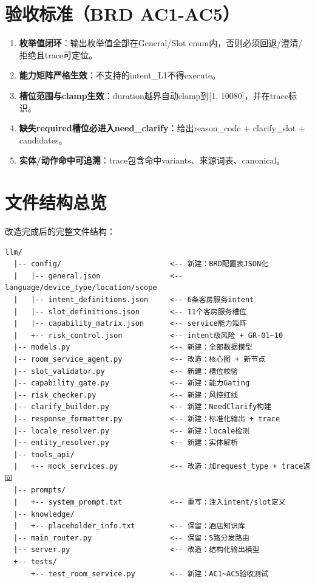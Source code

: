 \documentclass[12pt,a4paper]{ctexart}
\begin{document}
\section{验收标准（BRD AC1-AC5）}

\begin{enumerate}[label=\textbf{AC\arabic*}:, leftmargin=*]
    \item \textbf{枚举值闭环}：输出枚举值全部在General/Slot enum内，否则必须回退/澄清/拒绝且trace可定位。
    \item \textbf{能力矩阵严格生效}：不支持的intent\_L1不得execute。
    \item \textbf{槽位范围与clamp生效}：duration越界自动clamp到[1, 10080]，并在trace标识。
    \item \textbf{缺失required槽位必进入need\_clarify}：给出reason\_code + clarify\_slot + candidates。
    \item \textbf{实体/动作命中可追溯}：trace包含命中variants、来源词表、canonical。
\end{enumerate}

\newpage

\section{文件结构总览}

改造完成后的完整文件结构：

\begin{verbatim}
llm/
  |-- config/                         <-- 新建：BRD配置表JSON化
  |   |-- general.json                <-- language/device_type/location/scope
  |   |-- intent_definitions.json     <-- 6条客房服务intent
  |   |-- slot_definitions.json       <-- 11个客房服务槽位
  |   |-- capability_matrix.json      <-- service能力矩阵
  |   +-- risk_control.json           <-- intent级风险 + GR-01~10
  |-- models.py                       <-- 新建：全部数据模型
  |-- room_service_agent.py           <-- 改造：核心图 + 新节点
  |-- slot_validator.py               <-- 新建：槽位校验
  |-- capability_gate.py              <-- 新建：能力Gating
  |-- risk_checker.py                 <-- 新建：风控红线
  |-- clarify_builder.py              <-- 新建：NeedClarify构建
  |-- response_formatter.py           <-- 新建：标准化输出 + trace
  |-- locale_resolver.py              <-- 新建：locale检测
  |-- entity_resolver.py              <-- 新建：实体解析
  |-- tools_api/
  |   +-- mock_services.py            <-- 改造：加request_type + trace返回
  |-- prompts/
  |   +-- system_prompt.txt           <-- 重写：注入intent/slot定义
  |-- knowledge/
  |   +-- placeholder_info.txt        <-- 保留：酒店知识库
  |-- main_router.py                  <-- 保留：5路分发路由
  |-- server.py                       <-- 改造：结构化输出模型
  +-- tests/
      +-- test_room_service.py        <-- 新建：AC1~AC5验收测试
\end{verbatim}
\end{document}
